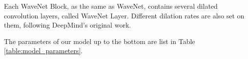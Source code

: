 Each WaveNet Block, as the same as WaveNet, contains several dilated convolution layers, called WaveNet Layer. Different dilation rates are also set on them, following DeepMind's original work.

The parameters of our model up to the bottom are list in Table \ref{table:model_parameters}.

\newcommand{\wavenetblockparams}[3]{
  \multirow{3}{*}{
    \(\begin{array}{l}\text{filters=#1}\\\text{kernel\_size=#2}\\\text{wavenet\_layers=#3}\end{array}\)
  }
}
\newcommand{\wavenetblockdetails}[2]{
  \multirow{3}{*}{
    \(\left[\begin{array}{l}\text{Conv1D (1)$\times$#1}\\\text{Conv1D (3)$\times$#1, tanh}\\\text{Conv1D (3)$\times$#1, sigmoid}\end{array}\right]\)$\times$ #2
    }
}
\newcommand{\floor}[1]{\lfloor #1 \rfloor}
\renewcommand\arraystretch{1.1}
\setlength{\tabcolsep}{3pt}
